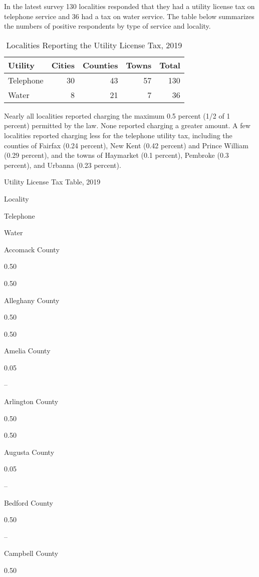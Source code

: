 \documentclass[
]{book}
\begin{document}
In the latest survey 130 localities responded that they had a utility license tax on telephone service and 36 had a tax on water service. The table below summarizes the numbers of positive respondents by type of service and locality.

\begin{table}

\caption{\label{tab:unnamed-chunk-1}Localities Reporting the Utility License Tax, 2019}
\centering
\begin{tabular}[t]{l|r|r|r|r}
\hline
Utility & Cities & Counties & Towns & Total\\
\hline
Telephone & 30 & 43 & 57 & 130\\
\hline
Water & 8 & 21 & 7 & 36\\
\hline
\end{tabular}
\end{table}

Nearly all localities reported charging the maximum 0.5 percent (1/2 of 1 percent) permitted by the law. None reported charging a greater amount. A few localities reported charging less for the telephone utility tax, including the counties of Fairfax (0.24 percent), New Kent (0.42 percent) and Prince William (0.29 percent), and the towns of Haymarket (0.1 percent), Pembroke (0.3 percent), and Urbanna (0.23 percent).

\label{tab:Table11-1}Utility License Tax Table, 2019

Locality

Telephone

Water

Accomack County

0.50

0.50

Alleghany County

0.50

0.50

Amelia County

0.05

--

Arlington County

0.50

0.50

Augusta County

0.05

--

Bedford County

0.50

--

Campbell County

0.50
\end{document}
